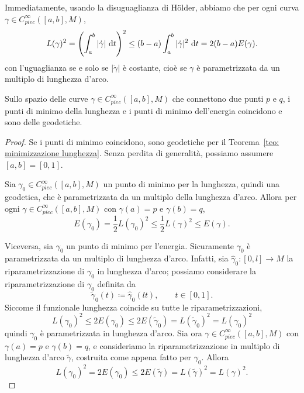 	Immediatamente, usando la disuguaglianza di H\"older, abbiamo che per ogni curva \(\gamma \in C^\infty_{piec}([a,b],M)\),
	\begin{equation}\label{eq: L^2<2E}
		L(\gamma)^2 = \left( \int_a^b |\dot \gamma| \ \mathrm{d} t\right)^2 \leq (b-a) \int_a^b |\dot \gamma|^2 \ \mathrm{d} t = 2(b-a) E(\gamma).
	\end{equation}
	con l'uguaglianza se e solo se \(|\dot \gamma|\) è costante, cioè se \(\gamma\) è parametrizzata da un multiplo di lunghezza d'arco. 
	\begin{teo}\label{teo: equiv minimi}
		Sullo spazio delle curve \(\gamma \in C^\infty_{piec}([a,b],M)\) che connettono due punti \(p\) e \(q\), i punti di minimo della lunghezza e i punti di minimo dell'energia coincidono e sono delle geodetiche.  
	\end{teo}
	\begin{proof}
		Se i punti di minimo coincidono, sono geodetiche per il Teorema~\ref{teo: minimizzazione lunghezza}. Senza perdita di generalità, possiamo assumere \([a,b]=[0,1]\).
		
		Sia \(\gamma_0 \in C^\infty_{piec}([a,b],M)\) un punto di minimo per la lunghezza, quindi una geodetica, che è parametrizzata da un multiplo della lunghezza d'arco. Allora per ogni \(\gamma \in C^\infty_{piec}([a,b],M)\) con \(\gamma(a)=p\) e \(\gamma(b)=q\), 
		\[
		E(\gamma_0) = \frac{1}{2}L(\gamma_0)^2 \leq \frac{1}{2}L(\gamma)^2 \leq E(\gamma).
		\]
		
		Viceversa, sia \(\gamma_0\) un punto di minimo per l'energia. Sicuramente \(\gamma_0\) è parametrizzata da un multiplo di lunghezza d'arco. Infatti, sia \(\hat{\gamma}_0:[0,l] \to M\) la riparametrizzazione di \(\gamma_0\) in lunghezza d'arco; possiamo considerare la riparametrizzazione di \(\gamma_0\) definita da
		\[
			\widetilde{\gamma}_0(t) \coloneq \hat{\gamma}_0(lt), \qquad t \in [0,1].
		\]
		Siccome il funzionale lunghezza coincide su tutte le riparametrizzazioni, 
		\[
			L(\gamma_0)^2 \leq 2E(\gamma_0) \leq 2E(\widetilde{\gamma}_0) = L(\widetilde{\gamma}_0)^2 = L(\gamma_0)^2
		\]
		quindi \(\gamma_0\) è parametrizzata in lunghezza d'arco. Sia ora \(\gamma \in C^\infty_{piec}([a,b],M)\) con \(\gamma(a)=p\) e \(\gamma(b)=q\), e consideriamo la riparametrizzazione in multiplo di lunghezza d'arco \(\widetilde{\gamma}\), costruita come appena fatto per \(\gamma_0\).
		Allora
		\[
		L(\gamma_0)^2 = 2E(\gamma_0) \leq 2 E(\widetilde{\gamma}) = L(\widetilde{\gamma})^2 = L(\gamma)^2.
		\]
	\end{proof}
	
